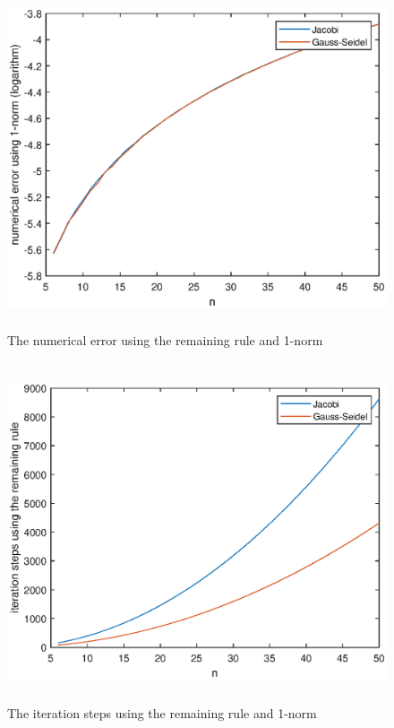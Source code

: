 \documentclass[UTF8,a4paper,10pt]{ctexart}
\begin{document}
\begin{figure}[ht]
    \centering
    \includegraphics[width=14cm,height=10cm]{2.1_error_remaining_1.eps}
    \caption{The numerical error using the remaining rule and 1-norm}
\end{figure}
\begin{figure}[ht]
    \centering
    \includegraphics[width=14cm,height=10cm]{2.1_steps_remaining_1.eps}
    \caption{The iteration steps using the remaining rule and 1-norm}
\end{figure}
\end{document}
